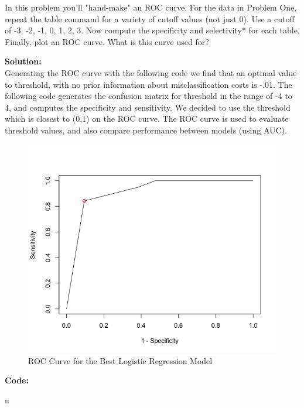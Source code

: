 \documentclass[12pt]{article}
\makeatletter
\theoremstyle{homework}
\newenvironment{exercise}[1]
{\def\@currentlabel{#1}\exercisecore}
{\endexercisecore}
\newcommand{\localhead}[1]{\par\smallskip\noindent\textbf{#1}\nobreak\\}%
\newcommand\solution{\localhead{Solution:}}
\makeatother
\begin{document}
\begin{exercise}{2}  In this problem you'll "hand-make" an ROC curve. For the data in Problem One, repeat the table command for a variety of cutoff values (not just
  0). Use a cutoff of -3, -2, -1, 0, 1, 2, 3. Now compute the specificity and selectivity* for each table. Finally, plot an ROC curve. What is this curve
  used for?\\
  \solution Generating the ROC curve with the following code we find that an optimal value to threshold, with no prior information about misclassification costs is -.01. 
  The following code generates the confusion matrix for threshold in the range of -4 to 4, and computes the specificity and sensitivity. We decided to use the threshold which is 
  closest to (0,1) on the ROC curve. The ROC curve is used to evaluate threshold values, and also compare performance between models (using AUC).
  \begin{figure}[H]
    \begin{center}
      \caption{ROC Curve for the Best Logistic Regression Model}
    \includegraphics[width = \textwidth]{Rplot.png}
    \end{center}
  \end{figure}
  \textbf{Code:}
  \begin{center}
  
  \end{center}n
\end{exercise}
\vspace{1in}
\end{document}

